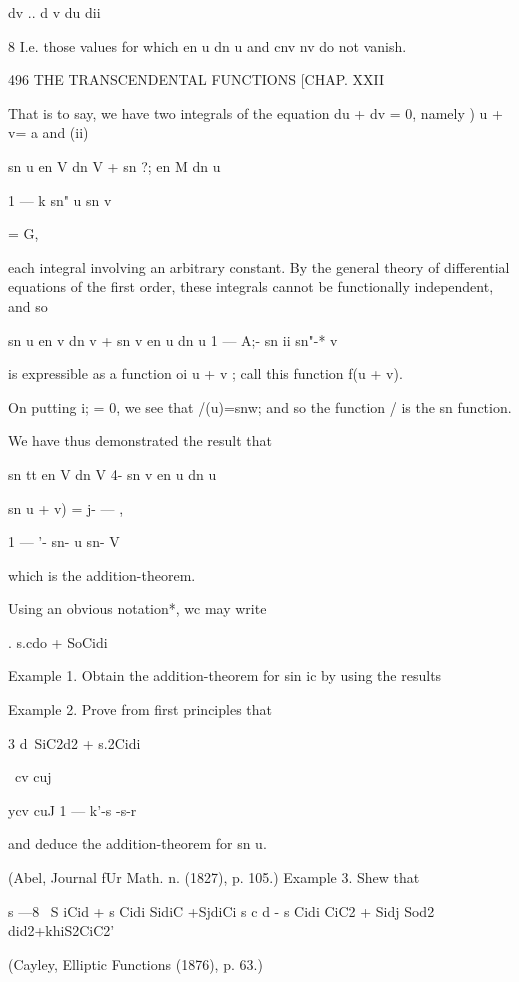 dv .. d v du dii

8 I.e. those values for which en u dn u and cnv nv do not vanish.



496 THE TRANSCENDENTAL FUNCTIONS [CHAP. XXII

That is to say, we have two integrals of the equation du + dv = 0,
namely ) u + v= a and (ii)

sn u en V dn V + sn ?; en M dn u



1 — k sn" u sn v



= G,



each integral involving an arbitrary constant. By the general theory
of differential equations of the first order, these integrals cannot
be functionally independent, and so

sn u en v dn v + sn v en u dn u 1 — A;- sn ii sn"-* v

is expressible as a function oi u + v ; call this function f(u + v).

On putting i; = 0, we see that /(u)=snw; and so the function / is the
sn function.

We have thus demonstrated the result that

sn tt en V dn V 4- sn v en u dn u

sn u + v) = j- — ,

1 — '- sn- u sn- V

which is the addition-theorem.

Using an obvious notation*, wc may write

. s.cdo + SoCidi

Example 1. Obtain the addition-theorem for sin ic by using the results

Example 2. Prove from first principles that

3 d\ SiC2d2 + s.2Cidi\



\ cv cuj



ycv cuJ 1 — k'-s -s-r

and deduce the addition-theorem for sn u.

(Abel, Journal fUr Math. n. (1827), p. 105.) Example 3. Shew that

s —8 \ S iCid + s Cidi SidiC +SjdiCi s c d - s Cidi CiC2 + Sidj Sod2
did2+khiS2CiC2'

(Cayley, Elliptic Functions (1876), p. 63.)

